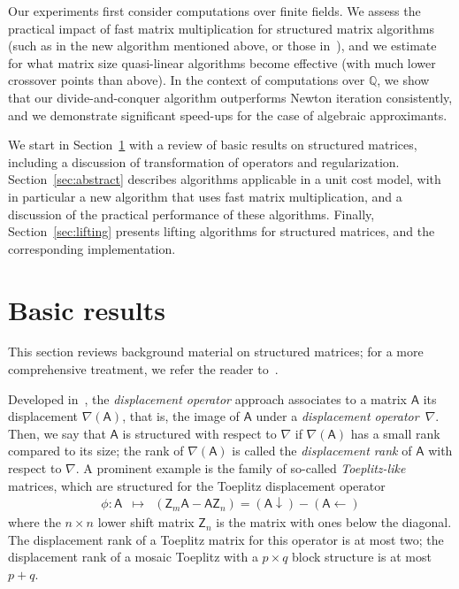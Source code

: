 \documentclass[sigconf]{acmart}
\newcommand{\mA}{\ensuremath{\mathsf{A}}}
\newcommand{\mZ}{\ensuremath{\mathsf{Z}}}
\newcommand{\Q}{\ensuremath{\mathbb{Q}}}
\theoremstyle{acmdefinition}
\begin{document}
Our experiments first consider computations over finite fields.  We
assess the practical impact of fast matrix multiplication for
structured matrix algorithms (such as in the new algorithm mentioned
above, or those in~\cite{BoJeSc08,BoJeMoSc16}), and we estimate for
what matrix size quasi-linear algorithms become effective (with much
lower crossover points than above). In the context of computations
over $\Q$, we show that our divide-and-conquer algorithm outperforms
Newton iteration consistently, and we demonstrate significant
speed-ups for the case of algebraic approximants.

We start in Section~\ref{sec:basics} with a review of basic results on
structured matrices, including a discussion of transformation of
operators and regularization. Section~\ref{sec:abstract} describes
algorithms applicable in a unit cost model, with in particular a new
algorithm that uses fast matrix multiplication, and a discussion of
the practical performance of these algorithms. Finally,
Section~\ref{sec:lifting} presents lifting algorithms for structured
matrices, and the corresponding implementation.


\vspace{-5px}
\section{Basic results}\label{sec:basics}

This section reviews background material on structured matrices; for a
more comprehensive treatment, we refer the reader to~\cite{Pan01}.


\smallskip{}  Developed
in~\cite{KaKuMo79}, the {\it displacement operator} approach
associates to a matrix $\mA$ its displacement $\nabla(\mA)$, that is, the
image of $\mA$ under a \textit{displacement operator}~$\nabla$.  Then,
we say that $\mA$ is structured with respect to $\nabla$ if $\nabla(\mA)$
has a small rank compared to its size; the rank of $\nabla(\mA)$ is
called the \textit{displacement rank} of $\mA$ with respect to
$\nabla$. A prominent example is the family of so-called {\em
  Toeplitz-like} matrices, which are structured for the Toeplitz
displacement operator
\begin{eqnarray*}
  \phi: \mA & \mapsto & \left( \mZ_m \mA - \mA \mZ_n \right) = 
                        (\mA \downarrow) - (\mA \leftarrow)
\end{eqnarray*}
where the $n \times n$ lower shift matrix $\mZ_n$ is the matrix
with ones below the diagonal.  The displacement rank of a Toeplitz
matrix for this operator is at most two; the displacement rank of a
mosaic Toeplitz with a $p \times q$ block structure is at most $p+q$.
\end{document}
